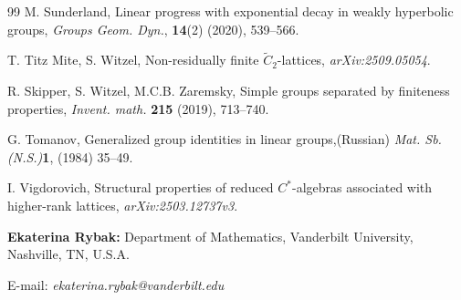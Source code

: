 \documentclass[11pt,letterpaper]{article}
\theoremstyle{definition}
\theoremstyle{remark}
\begin{document}
\begin{thebibliography}{99}
M. Sunderland, Linear progress with exponential decay in weakly hyperbolic groups, \emph{Groups Geom. Dyn.}, \textbf {14}(2) (2020), 539--566.

T. Titz Mite, S. Witzel, Non-residually finite $\widetilde{C}_2$-lattices, \emph{	arXiv:2509.05054}.

R. Skipper, S. Witzel, M.C.B. Zaremsky, Simple groups separated by finiteness properties, \emph{Invent. math.} \textbf{215} (2019), 713–740.

G. Tomanov, Generalized group identities in linear groups,(Russian) \emph{Mat. Sb. (N.S.)}\textbf{1}, (1984) 35--49.

I. Vigdorovich, Structural properties of reduced $C^*$-algebras associated with higher-rank lattices, \emph{arXiv:2503.12737v3}.

\end{thebibliography}

\vspace{5mm}

\noindent \textbf{Ekaterina Rybak: } Department of Mathematics, Vanderbilt University, Nashville, TN, U.S.A.

\noindent E-mail: \emph{ekaterina.rybak@vanderbilt.edu}
\end{document}
